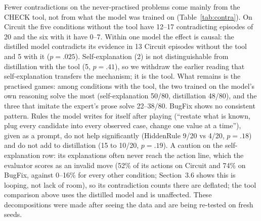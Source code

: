 \documentclass[11pt]{article}
\begin{document}
Fewer contradictions on the never-practised problems come mainly from the CHECK tool, not from what the model was
trained on (Table~\ref{tab:contra}). On Circuit the five conditions without the tool have 12--17 contradicting
episodes of 20 and the six with it have 0--7. Within one model the effect is causal: the distilled model
contradicts its evidence in 13 Circuit episodes without the tool and 5 with it ($p=.025$). Self-explanation (2) is
not distinguishable from distillation with the tool (5, $p=.41$), so we withdraw the earlier reading that
self-explanation transfers the mechanism; it is the tool. What remains is the practised games: among conditions
with the tool, the two trained on the model's own reasoning solve the most (self-explanation 50/80, distillation
48/80), and the three that imitate the expert's prose solve 22--38/80. BugFix shows no consistent pattern. Rules the
model writes for itself after playing (``restate what is known, plug every candidate into every observed case,
change one value at a time''), given as a prompt, do not help significantly (HiddenRule 9/20 vs 4/20, $p=.18$) and
do not add to distillation (15 to 10/20, $p=.19$). A caution on the self-explanation row: its explanations often
never reach the action line, which the evaluator scores as an invalid move (52\% of its actions on Circuit and
74\% on BugFix, against 0--16\% for every other condition; Section~3.6 shows this is looping, not lack of room),
so its contradiction counts there are deflated; the tool comparison above uses the distilled model and is unaffected.
These decompositions were made after seeing the data and are being re-tested on fresh seeds.
\end{document}
